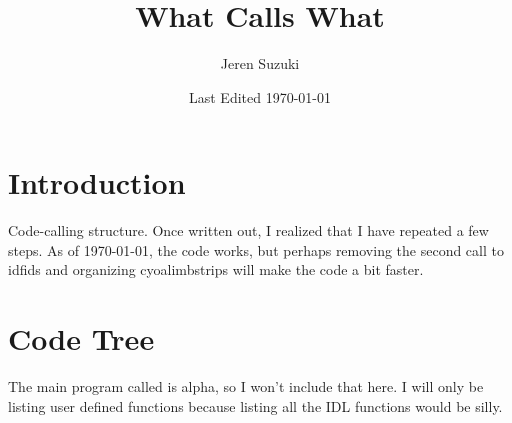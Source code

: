 \documentclass[10pt]{scrartcl}
\title{What Calls What}
\author{Jeren Suzuki}
\date{Last Edited \today}
\begin{document}
\maketitle
\tableofcontents
{}
\clearpage
{}

\section*{Introduction}
\label{sec:intro}
Code-calling structure. Once written out, I realized that I have repeated a few steps. As of \today, the code works, but perhaps removing the second call to idfids and organizing cyoalimbstrips will make the code a bit faster.


\section{Code Tree} %
\label{sec:code_tree}

The main program called is alpha, so I won't include that here. I will only be listing user defined functions because listing all the IDL functions would be silly.\\
\end{document}

